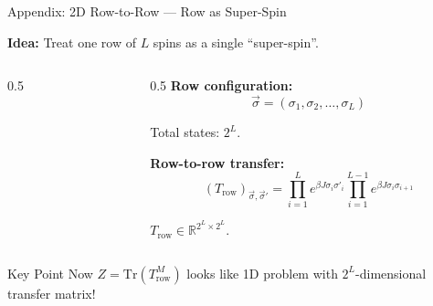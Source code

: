 \documentclass[aspectratio=169, 11pt]{beamer}
\begin{document}
\begin{frame}{Appendix: 2D Row-to-Row --- Row as Super-Spin}
    
    \textbf{Idea:} Treat one row of $L$ spins as a single ``super-spin''.
    
    \vspace{0.3cm}
    
    \begin{columns}
        \begin{column}{0.5\textwidth}
            \begin{center}
            \end{center}
        \end{column}
        
        \begin{column}{0.5\textwidth}
            \textbf{Row configuration:}
            \[
            \vec{\sigma} = (\sigma_1, \sigma_2, \ldots, \sigma_L)
            \]
            
            Total states: $2^L$.
            
            \vspace{0.3cm}
            
            \textbf{Row-to-row transfer:}
            \[
            (T_{\text{row}})_{\vec{\sigma}, \vec{\sigma}'} = \prod_{i=1}^L e^{\beta J \sigma_i \sigma'_i} \prod_{i=1}^{L-1} e^{\beta J \sigma_i \sigma_{i+1}}
            \]
            
            $T_{\text{row}} \in \mathbb{R}^{2^L \times 2^L}$.
        \end{column}
    \end{columns}
    
    \vspace{0.3cm}
    
    \begin{block}{Key Point}
        Now $Z = \text{Tr}(T_{\text{row}}^M)$ looks like 1D problem with $2^L$-dimensional transfer matrix!
    \end{block}
\end{frame}
\end{document}
